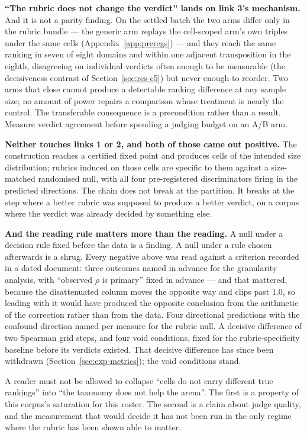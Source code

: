 \textbf{``The rubric does not change the verdict'' lands on link 3's
mechanism.} And it is not a parity finding. On the settled batch the
two arms differ only in the rubric bundle --- the generic arm replays
the cell-scoped arm's own triples under the same cells
(Appendix~\ref{app:preregs}) --- and they reach the same ranking in
seven of eight domains and within one adjacent transposition in the
eighth, disagreeing on individual verdicts often enough to be
measurable (the decisiveness contrast of Section~\ref{sec:res-c5})
but never enough to reorder. Two arms that close cannot produce a
detectable ranking difference at any sample size; no amount of power
repairs a comparison whose treatment is nearly the control.
The transferable consequence is a precondition rather than a result.
Measure verdict agreement before spending a judging budget on an A/B
arm.

\textbf{Neither touches links 1 or 2, and both of those came out
positive.} The construction reaches a certified fixed point and
produces cells of the intended size distribution; rubrics induced on
those cells are specific to them against a size-matched randomised
null, with all four pre-registered discriminators firing in the
predicted directions. The chain does not
break at the partition. It breaks at the step where a better rubric was
supposed to produce a better verdict, on a corpus where the verdict was
already decided by something else.

\textbf{And the reading rule matters more than the reading.} A null
under a decision rule fixed before the data is a finding. A null under a
rule chosen afterwards is a shrug. Every negative above was read
against a criterion recorded in a dated document: three outcomes named
in advance for the granularity analysis, with ``observed $\rho$ is
primary'' fixed in advance --- and that mattered, because the
disattenuated column moves the opposite way and clips past $1.0$, so
leading with it would have produced the opposite conclusion from the
arithmetic of the correction rather than from the data. Four
directional predictions with the confound direction named per measure
for the rubric null. A decisive difference of two Spearman grid steps,
and four void conditions, fixed for the rubric-specificity baseline
before its verdicts existed. That decisive difference has since been
withdrawn (Section~\ref{sec:exp-metrics}); the void conditions stand.

A reader must not be allowed to collapse ``cells do not carry different
true rankings'' into ``the taxonomy does not help the arena''. The first
is a property of this corpus's saturation for this roster. The second is
a claim about judge quality, and the measurement that would decide it
has not been run in the only regime where the rubric has been shown able
to matter.

